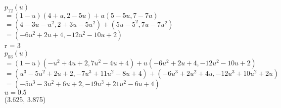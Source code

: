 \documentclass[12pt]{article}
\begin{document}
\begin{enumerate}
$p_{12}(u) $ \\
$= (1-u)(4+u,2-5u)+u(5-5u,7-7u)$ \\
$= (4-3u-u^2,2+3u-5u^2) + (5u-5^2,7u-7u^2)$ \\
$= (-6u^2+2u+4,-12u^2-10u+2)$ \\

r = 3 \\
$p_{03}(u) $ \\
$= (1-u)(-u^2+4u+2,7u^2-4u+4)+u(-6u^2+2u+4,-12u^2-10u+2)$ \\
$= (u^3-5u^2+2u+2,-7u^3+11u^2-8u+4) + (-6u^3+2u^2+4u,-12u^3+10u^2+2u)$ \\
$= (-5u^3-3u^2+6u+2,-19u^3+21u^2-6u+4)$ \\

$u = 0.5$ \\

(3.625, 3.875) \\

\end{enumerate}
\end{document}

